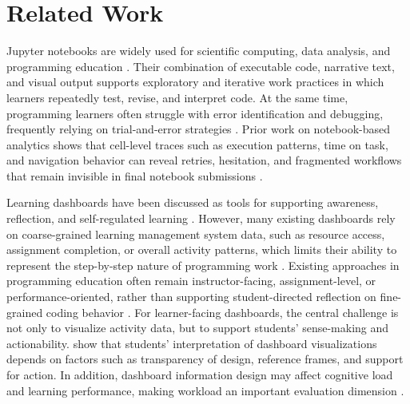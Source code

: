 \documentclass[acmsmall]{acmart}
\begin{document}
\section{Related Work}
Jupyter notebooks are widely used for scientific computing, data analysis, and programming education \cite{perkel2018jupyter}. Their combination of executable code, narrative text, and visual output supports exploratory and iterative work practices in which learners repeatedly test, revise, and interpret code. At the same time, programming learners often struggle with error identification and debugging, frequently relying on trial-and-error strategies \cite{robinson2022error}. Prior work on notebook-based analytics shows that cell-level traces such as execution patterns, time on task, and navigation behavior can reveal retries, hesitation, and fragmented workflows that remain invisible in final notebook submissions \cite{cai2025jupyter,JELAI}. %

Learning dashboards have been discussed as tools for supporting awareness, reflection, and self-regulated learning \cite{schwendimann2016perceiving,corrin2014exploring}. However, many existing dashboards rely on coarse-grained learning management system data, such as resource access, assignment completion, or overall activity patterns, which limits their ability to represent the step-by-step nature of programming work \cite{paulsen2024learning}. %
Existing approaches in programming education often remain instructor-facing, assignment-level, or performance-oriented, rather than supporting student-directed reflection on fine-grained coding behavior \cite{sondagar2021elearning,groher2024learning}. For learner-facing dashboards, the central challenge is not only to visualize activity data, but to support students' sense-making and actionability. \cite{jivet2020students} show that students' interpretation of dashboard visualizations depends on factors such as transparency of design, reference frames, and support for action. In addition, dashboard information design may affect cognitive load and learning performance, making workload an important evaluation dimension \cite{cheng2024influence}. %
\end{document}
